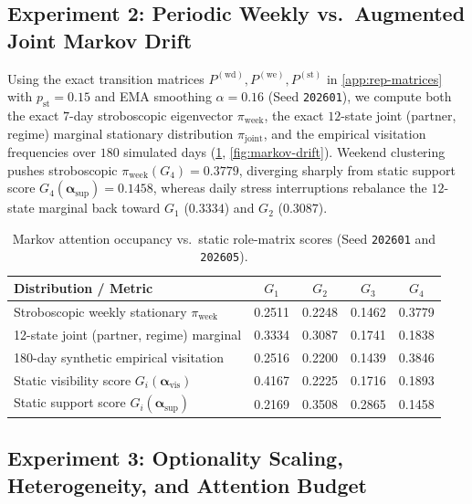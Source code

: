 \subsection{Experiment 2: Periodic Weekly vs.\ Augmented Joint Markov Drift}
\label{subsec:sim-markov}

Using the exact transition matrices $P^{(\mathrm{wd})}, P^{(\mathrm{we})}, P^{(\mathrm{st})}$
in \cref{app:rep-matrices} with $p_{\mathrm{st}} = 0.15$ and EMA smoothing $\alpha = 0.16$
(Seed \texttt{202601}), we compute both the exact $7$-day stroboscopic eigenvector
$\pi_{\mathrm{week}}$, the exact $12$-state joint (partner, regime) marginal stationary
distribution $\pi_{\mathrm{joint}}$, and the empirical visitation frequencies over $180$
simulated days (\cref{tab:markov-stationary}, \cref{fig:markov-drift}). Weekend clustering
pushes stroboscopic $\pi_{\mathrm{week}}(G_4) = 0.3779$, diverging sharply from static support
score $G_4(\boldsymbol{\alpha}_{\mathrm{sup}}) = 0.1458$, whereas daily stress interruptions
rebalance the $12$-state marginal back toward $G_1$ ($0.3334$) and $G_2$ ($0.3087$).

\begin{table}[htbp]
\centering
\small
\caption{Markov attention occupancy vs.\ static role-matrix scores (Seed \texttt{202601} and \texttt{202605}).}
\label{tab:markov-stationary}
\begin{tabular}{@{}lcccc@{}}
\toprule
Distribution / Metric & $G_1$ & $G_2$ & $G_3$ & $G_4$ \\
\midrule
Stroboscopic weekly stationary $\pi_{\mathrm{week}}$ & 0.2511 & 0.2248 & 0.1462 & 0.3779 \\
12-state joint (partner, regime) marginal & 0.3334 & 0.3087 & 0.1741 & 0.1838 \\
180-day synthetic empirical visitation & 0.2516 & 0.2200 & 0.1439 & 0.3846 \\
Static visibility score $G_i(\boldsymbol{\alpha}_{\mathrm{vis}})$ & 0.4167 & 0.2225 & 0.1716 & 0.1893 \\
Static support score $G_i(\boldsymbol{\alpha}_{\mathrm{sup}})$ & 0.2169 & 0.3508 & 0.2865 & 0.1458 \\
\bottomrule
\end{tabular}
\end{table}

\subsection{Experiment 3: Optionality Scaling, Heterogeneity, and Attention Budget}
\label{subsec:sim-optionality}

